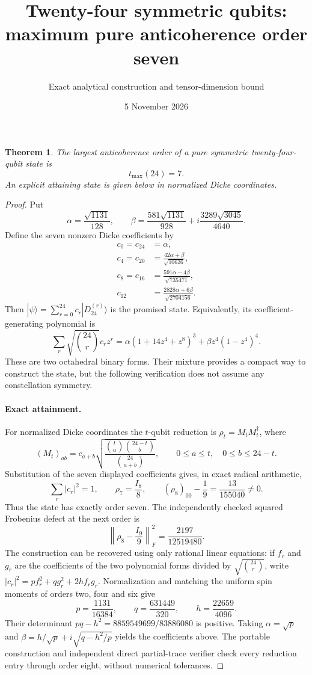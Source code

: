\documentclass[11pt]{article}
\newtheorem{theorem}{Theorem}
\begin{document}
\title{Twenty-four symmetric qubits: maximum pure anticoherence order seven}
\author{Exact analytical construction and tensor-dimension bound}
\date{5 November 2026}\maketitle
\begin{theorem}
The largest anticoherence order of a pure symmetric twenty-four-qubit state is
\[\boxed{t_{\max}(24)=7.}\]
An explicit attaining state is given below in normalized Dicke coordinates.
\end{theorem}
\begin{proof}
Put
\[
\alpha=\frac{\sqrt{1131}}{128},\qquad
\beta=\frac{581\sqrt{1131}}{928}
+i\frac{3289\sqrt{3045}}{4640}.
\]
Define the seven nonzero Dicke coefficients by
\[
\begin{aligned}
c_0=c_{24}&=\alpha,\\
c_4=c_{20}&=\frac{42\alpha+\beta}{\sqrt{10626}},\\
c_8=c_{16}&=\frac{591\alpha-4\beta}{\sqrt{735471}},\\
c_{12}&=\frac{2828\alpha+6\beta}{\sqrt{2704156}}.
\end{aligned}
\]
Then $|\psi\rangle=\sum_{r=0}^{24}c_r|D_{24}^{(r)}\rangle$ is the promised state.
Equivalently, its coefficient-generating polynomial is
\[
\sum_r\sqrt{\binom{24}{r}}c_r z^r
=\alpha(1+14z^4+z^8)^3+\beta z^4(1-z^4)^4.
\]
These are two octahedral binary forms. Their mixture provides a compact
way to construct the state, but the following verification does not assume
any constellation symmetry.

\paragraph{Exact attainment.}
For normalized Dicke coordinates the $t$-qubit reduction is $\rho_t=M_tM_t^\dagger$,
where
\[
(M_t)_{ab}=c_{a+b}
\sqrt{\frac{\binom ta\binom{24-t}b}{\binom{24}{a+b}}},\qquad
0\le a\le t,\quad0\le b\le24-t.
\]
Substitution of the seven displayed coefficients gives, in exact radical arithmetic,
\[
\sum_r|c_r|^2=1,\qquad \rho_7=\frac{I_8}{8},\qquad
(\rho_8)_{00}-\frac19=\frac{13}{155040}\ne0.
\]
Thus the state has exactly order seven. The independently checked squared
Frobenius defect at the next order is
\[
\left\|\rho_8-\frac{I_9}{9}\right\|_F^2=\frac{2197}{12519480}.
\]
The construction can be recovered using only rational linear equations:
if $f_r$ and $g_r$ are the coefficients of the two polynomial forms divided by
$\sqrt{\binom{24}{r}}$, write
$|c_r|^2=p f_r^2+q g_r^2+2h f_rg_r$.
Normalization and matching the uniform spin moments of orders two, four and six give
\[
p=\frac{1131}{16384},\qquad q=\frac{631449}{320},\qquad
h=\frac{22659}{4096}.
\]
Their determinant $pq-h^2=8859549699/83886080$ is positive.
Taking $\alpha=\sqrt p$ and
$\beta=h/\sqrt p+i\sqrt{q-h^2/p}$ yields the coefficients above.
The portable construction and independent direct partial-trace verifier
check every reduction entry through order eight, without numerical tolerances.


\end{proof}
\end{document}
